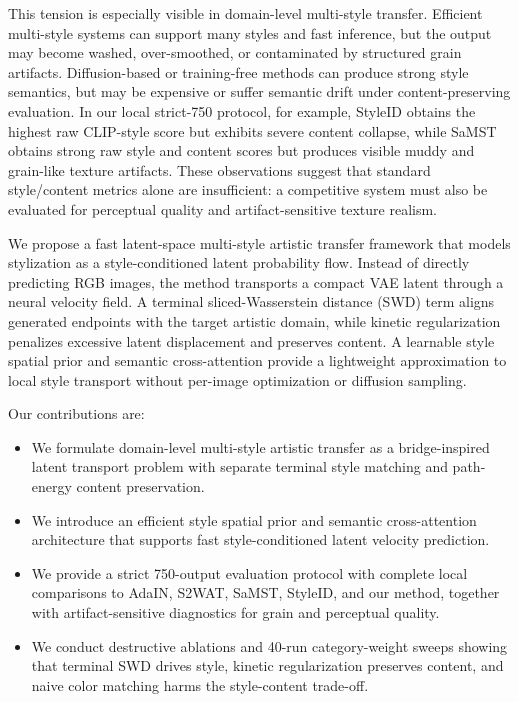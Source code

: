 \documentclass{article}
\begin{document}
This tension is especially visible in domain-level multi-style transfer. Efficient multi-style systems can support many styles and fast inference, but the output may become washed, over-smoothed, or contaminated by structured grain artifacts. Diffusion-based or training-free methods can produce strong style semantics, but may be expensive or suffer semantic drift under content-preserving evaluation. In our local strict-750 protocol, for example, StyleID obtains the highest raw CLIP-style score but exhibits severe content collapse, while SaMST obtains strong raw style and content scores but produces visible muddy and grain-like texture artifacts. These observations suggest that standard style/content metrics alone are insufficient: a competitive system must also be evaluated for perceptual quality and artifact-sensitive texture realism.

We propose a fast latent-space multi-style artistic transfer framework that models stylization as a style-conditioned latent probability flow. Instead of directly predicting RGB images, the method transports a compact VAE latent through a neural velocity field. A terminal sliced-Wasserstein distance (SWD) term aligns generated endpoints with the target artistic domain, while kinetic regularization penalizes excessive latent displacement and preserves content. A learnable style spatial prior and semantic cross-attention provide a lightweight approximation to local style transport without per-image optimization or diffusion sampling.

Our contributions are:
\begin{itemize}
    \item We formulate domain-level multi-style artistic transfer as a bridge-inspired latent transport problem with separate terminal style matching and path-energy content preservation.
    \item We introduce an efficient style spatial prior and semantic cross-attention architecture that supports fast style-conditioned latent velocity prediction.
    \item We provide a strict 750-output evaluation protocol with complete local comparisons to AdaIN, S2WAT, SaMST, StyleID, and our method, together with artifact-sensitive diagnostics for grain and perceptual quality.
    \item We conduct destructive ablations and 40-run category-weight sweeps showing that terminal SWD drives style, kinetic regularization preserves content, and naive color matching harms the style-content trade-off.
\end{itemize}
\end{document}
